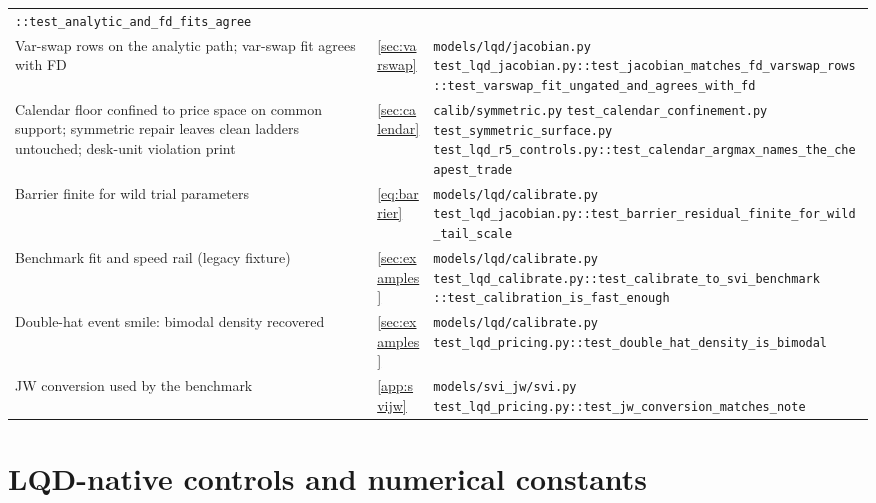 \documentclass[11pt]{article}
\begin{document}
\begin{longtable}{@{}p{}p{}p{}@{}}
\nolinkurl{::test_analytic_and_fd_fits_agree}\\
\addlinespace
Var-swap rows on the analytic path; var-swap fit agrees with FD &
\cref{sec:varswap} &
\nolinkurl{models/lqd/jacobian.py}\newline
\nolinkurl{test_lqd_jacobian.py::test_jacobian_matches_fd_varswap_rows}\newline
\nolinkurl{::test_varswap_fit_ungated_and_agrees_with_fd}\\
\addlinespace
Calendar floor confined to price space on common support; symmetric repair
leaves clean ladders untouched; desk-unit violation print &
\cref{sec:calendar} &
\nolinkurl{calib/symmetric.py}\newline
\nolinkurl{test_calendar_confinement.py}\newline
\nolinkurl{test_symmetric_surface.py}\newline
\nolinkurl{test_lqd_r5_controls.py::test_calendar_argmax_names_the_cheapest_trade}\\
\addlinespace
Barrier finite for wild trial parameters &
\eqref{eq:barrier} &
\nolinkurl{models/lqd/calibrate.py}\newline
\nolinkurl{test_lqd_jacobian.py::test_barrier_residual_finite_for_wild_tail_scale}\\
\addlinespace
Benchmark fit and speed rail (legacy fixture) &
\cref{sec:examples} &
\nolinkurl{models/lqd/calibrate.py}\newline
\nolinkurl{test_lqd_calibrate.py::test_calibrate_to_svi_benchmark}\newline
\nolinkurl{::test_calibration_is_fast_enough}\\
\addlinespace
Double-hat event smile: bimodal density recovered &
\cref{sec:examples} &
\nolinkurl{models/lqd/calibrate.py}\newline
\nolinkurl{test_lqd_pricing.py::test_double_hat_density_is_bimodal}\\
\addlinespace
JW conversion used by the benchmark &
\cref{app:svijw} &
\nolinkurl{models/svi_jw/svi.py}\newline
\nolinkurl{test_lqd_pricing.py::test_jw_conversion_matches_note}\\
\bottomrule
\end{longtable}
\endgroup

\appendix
\section{LQD-native controls and numerical constants}
\label{app:atlas}
\end{document}
